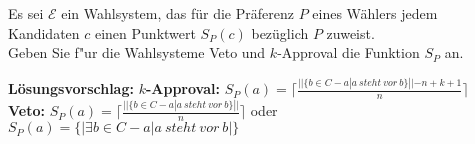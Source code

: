 \documentclass[a4paper,12pt,titlepage,oneside]{article}
\newcommand{\vs}{\mathcal{E}}
\begin{document}
\newpage

\newline
Es sei $\vs$ ein Wahlsystem, das f\"ur die Pr\"aferenz $P$ eines W\"ahlers jedem 
Kandidaten $c$ einen Punktwert $S_P(c)$ bez\"uglich $P$ zuweist.\\
Geben Sie f"ur die Wahlsysteme Veto und $k$-Approval die Funktion $S_P$ an.

\vspace{0.5cm}

\noindent\textbf{L\"osungsvorschlag:}
\newline
\textbf{$k$-Approval:} $S_{P}(a)=\lceil {\frac{||\{b \in C - {a}| a\  steht\  vor\  b\}||-n+k+1}{n}}\rceil$\\ 
\textbf{Veto:} $S_{P}(a)=\lceil {\frac{||\{b \in C - {a}| a\  steht\  vor\  b\}||}{n}}\rceil$ oder $S_{P}(a)=\{|\exists b \in C - {a}| a\  steht\  vor\  b|\}$
\end{document}
